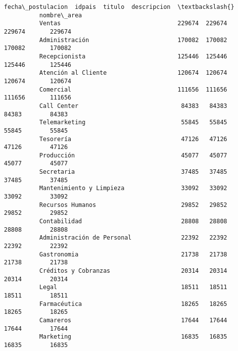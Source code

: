 \documentclass[11pt]{article}
\begin{document}
\begin{Verbatim}[commandchars=\\\{\}]
                                      fecha\_postulacion  idpais  titulo  descripcion  \textbackslash{}
          nombre\_area                                                                  
          Ventas                                 229674  229674  229674       229674   
          Administración                         170082  170082  170082       170082   
          Recepcionista                          125446  125446  125446       125446   
          Atención al Cliente                    120674  120674  120674       120674   
          Comercial                              111656  111656  111656       111656   
          Call Center                             84383   84383   84383        84383   
          Telemarketing                           55845   55845   55845        55845   
          Tesorería                               47126   47126   47126        47126   
          Producción                              45077   45077   45077        45077   
          Secretaria                              37485   37485   37485        37485   
          Mantenimiento y Limpieza                33092   33092   33092        33092   
          Recursos Humanos                        29852   29852   29852        29852   
          Contabilidad                            28808   28808   28808        28808   
          Administración de Personal              22392   22392   22392        22392   
          Gastronomia                             21738   21738   21738        21738   
          Créditos y Cobranzas                    20314   20314   20314        20314   
          Legal                                   18511   18511   18511        18511   
          Farmacéutica                            18265   18265   18265        18265   
          Camareros                               17644   17644   17644        17644   
          Marketing                               16835   16835   16835        16835   
          

\end{Verbatim}
\end{document}
